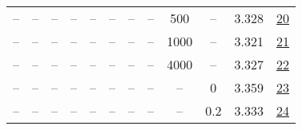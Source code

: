 \begin{table}[H]
\begin{tabular}{cccccccccccc}
-- & -- & -- & -- & -- & -- & -- & -- & 500 & -- & 3.328 & \href{https://wandb.ai/stanford-mercury/optimizer-scaling/runs/sweep-130m-10B-mars342f3elr0.008-wd0.1-minlr0-warmup500-b10.9-b2-6f0cc9}{20} \\
-- & -- & -- & -- & -- & -- & -- & -- & 1000 & -- & 3.321 & \href{https://wandb.ai/stanford-mercury/optimizer-scaling/runs/sweep-130m-10B-mars6550falr0.008-wd0.1-minlr0-warmup1000-b10.9-b-c87967}{21} \\
-- & -- & -- & -- & -- & -- & -- & -- & 4000 & -- & 3.327 & \href{https://wandb.ai/stanford-mercury/optimizer-scaling/runs/sweep-130m-10B-marsa60af3lr0.008-wd0.1-minlr0-warmup4000-b10.9-b-c01162}{22} \\
-- & -- & -- & -- & -- & -- & -- & -- & -- & 0 & 3.359 & \href{https://wandb.ai/stanford-mercury/optimizer-scaling/runs/sweep-130m-10B-mars6d8040lr0.008-wd0-minlr0-warmup2000-b10.9-b20-f87fd6}{23} \\
-- & -- & -- & -- & -- & -- & -- & -- & -- & 0.2 & 3.333 & \href{https://wandb.ai/stanford-mercury/optimizer-scaling/runs/sweep-130m-10B-marsdc1e1alr0.008-wd0.2-minlr0-warmup2000-b10.9-b-9c4043}{24} \\
\bottomrule
\end{tabular}
\end{table}

